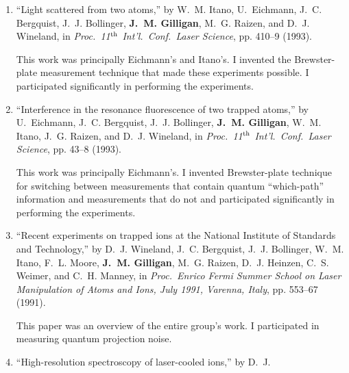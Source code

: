 \begin{enumerate}
{	  Symposium}, vol. 3601, pp. 122--9 (SPIE, 1999). 
	  \begin{credit}
	   I contributed significantly to designing and performing the experiments, analyzing the data, and writing the paper. My contribution to the experiments included designing and performing the laser irradiation and performing FTIR spectroscopy on the samples before and after irradiation.
	  \end{credit}
	\item
	\enquote{Light scattered from two atoms,}  by W.~M. Itano, U.~Eichmann, J.~C.
	  Bergquist, J.~J. Bollinger, \textbf{J.~M. Gilligan}, M.~G. Raizen, and D.~J. Wineland,
	  in \emph{Proc.\ 11$^{\mbox{\scriptsize th}}$ Int'l.\ Conf.\ Laser Science},
	  pp. 410--9 (1993). 
	  \begin{credit}
	   This work was principally Eichmann's and Itano's. I invented the Brewster-plate measurement technique that made these experiments possible. I participated significantly in performing the experiments.
	  \end{credit}
	\item
	\enquote{Interference in the resonance fluorescence of two trapped atoms,}  by
	  U.~Eichmann, J.~C. Bergquist, J.~J. Bollinger, \textbf{J.~M. Gilligan}, W.~M. Itano,
	  J.~G. Raizen, and D.~J. Wineland, in \emph{Proc.\ 11$^{\mbox{\scriptsize
	  th}}$ Int'l.\ Conf.\ Laser Science}, pp. 43--8 (1993). 
	  \begin{credit}
	   This work was principally Eichmann's. I invented Brewster-plate technique for switching between measurements that contain quantum ``which-path'' information and measurements that do not and participated significantly in performing the experiments. 
	  \end{credit}
	\item
	\enquote{Recent experiments on trapped ions at the {N}ational {I}nstitute of
	  {S}tandards and {T}echnology,}  by D.~J. Wineland, J.~C. Bergquist, J.~J.
	  Bollinger, W.~M. Itano, F.~L. Moore, \textbf{J.~M. Gilligan}, M.~G. Raizen, D.~J.
	  Heinzen, C.~S. Weimer, and C.~H. Manney, in \emph{Proc.\ Enrico Fermi Summer
	  School on Laser Manipulation of Atoms and Ions, {J}uly 1991, {V}arenna,
	  {I}taly}, pp. 553--67 (1991). 
	  \begin{credit}
	   This paper was an overview of the entire group's work. I participated in measuring quantum projection noise.
	  \end{credit}
	\item
	\enquote{High-resolution spectroscopy of laser-cooled ions,}  by D.~J.

\end{enumerate}
